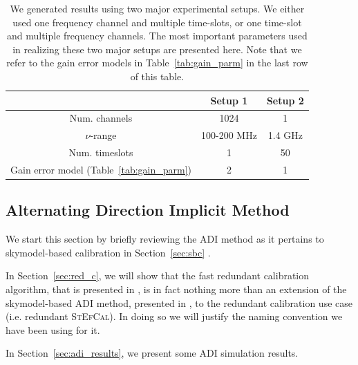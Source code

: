 \documentclass[useAMS,usenatbib]{mn2e}
\newcommand{\bz}{\bmath{z}}
\newcommand{\bone}{\bmath{1}}
\begin{document}
\begin{table}
\centering
\caption{We generated results using two major experimental setups. We either used one frequency channel and multiple time-slots, or one time-slot and multiple frequency 
channels. The most important parameters used in realizing these two major setups are presented here. Note that we refer to the gain error models in Table~\ref{tab:gain_parm} in the 
last row of this table.}
\begin{tabular}{|c c c|} 
\hline
 & Setup 1 & Setup 2\\
\hline
\hline
 Num. channels & 1024 & 1\\
$\nu$-range & 100-200 MHz & 1.4 GHz\\
Num. timeslots & 1 & 50\\
Gain error model (Table~\ref{tab:gain_parm}) & 2 & 1\\
\hline
\end{tabular}
\label{tab:ch_parm}
\end{table}

\subsection{Alternating Direction Implicit Method}
\label{sec:adi}
We start this section by briefly reviewing the ADI method as it pertains to skymodel-based calibration in Section~\ref{sec:sbc} \citep{Salvini2014,Smirnov2015}.

In Section~\ref{sec:red_c}, we will show that the fast redundant calibration algorithm, that is presented in \citet{Marthi2014},
is in fact nothing more than an extension of the skymodel-based ADI method, presented in \citet{Salvini2014}, to the redundant calibration use case (i.e. redundant \textsc{StEfCal}).
In doing so we will justify the naming convention we have been using for it.

In Section~\ref{sec:adi_results}, we present some ADI simulation results. 
\end{document}
